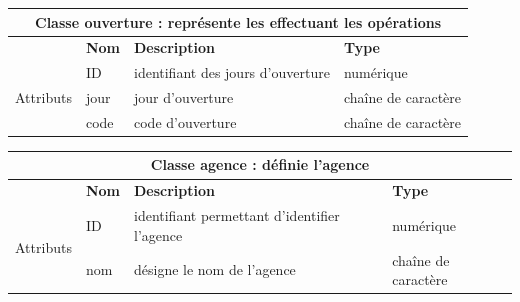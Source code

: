 		\begin{center}
			{\renewcommand{\arraystretch}{1.5}\begin{tabularx}{\textwidth}{|l|l|l|X|}
					\hline
					\multicolumn{4}{|c|}{\textbf{Classe ouverture : représente les effectuant les opérations}} \\
					
					\hline
					
					& \textbf{Nom} & \textbf{Description} & \textbf{Type} \\
					\multirow{3}{*}{Attributs} & ID & identifiant des jours d'ouverture & numérique \\
					
					& jour & jour d'ouverture & chaîne de caractère \\
					
					& code & code d'ouverture & chaîne de caractère \\
					\hline
			\end{tabularx}}
			\label{table10}
		\end{center}
		
		
		\begin{center}
			{\renewcommand{\arraystretch}{1.5}\begin{tabularx}{\textwidth}{|l|l|l|X|}
				\hline
				\multicolumn{4}{|c|}{\textbf{Classe agence : définie l'agence}} \\
				
				\hline
				
				& \textbf{Nom} & \textbf{Description} & \textbf{Type} \\
				\multirow{3}{*}{Attributs} & ID & identifiant permettant d'identifier l'agence & numérique \\
				
				& nom & désigne le nom de l'agence& chaîne de caractère \\
				
				\hline
			\end{tabularx}}
			\label{table14}
		\end{center}
		
